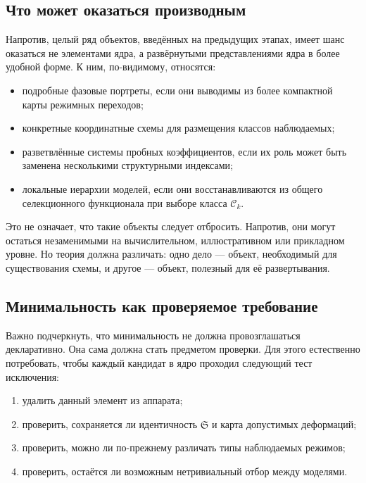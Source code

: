 \documentclass[12pt,a4paper]{article}
\begin{document}
\subsection{Что может оказаться производным}

Напротив, целый ряд объектов, введённых на предыдущих этапах, имеет шанс оказаться не элементами ядра, а развёрнутыми представлениями ядра в более удобной форме. К ним, по-видимому, относятся:
\begin{itemize}
    \item подробные фазовые портреты, если они выводимы из более компактной карты режимных переходов;
    \item конкретные координатные схемы для размещения классов наблюдаемых;
    \item разветвлённые системы пробных коэффициентов, если их роль может быть заменена несколькими структурными индексами;
    \item локальные иерархии моделей, если они восстанавливаются из общего селекционного функционала при выборе класса \(\mathcal{C}_k\).
\end{itemize}

Это не означает, что такие объекты следует отбросить. Напротив, они могут остаться незаменимыми на вычислительном, иллюстративном или прикладном уровне. Но теория должна различать: одно дело --- объект, необходимый для существования схемы, и другое --- объект, полезный для её развертывания.

\subsection{Минимальность как проверяемое требование}

Важно подчеркнуть, что минимальность не должна провозглашаться декларативно. Она сама должна стать предметом проверки. Для этого естественно потребовать, чтобы каждый кандидат в ядро проходил следующий тест исключения:
\begin{enumerate}
    \item удалить данный элемент из аппарата;
    \item проверить, сохраняется ли идентичность \(\mathfrak{S}\) и карта допустимых деформаций;
    \item проверить, можно ли по-прежнему различать типы наблюдаемых режимов;
    \item проверить, остаётся ли возможным нетривиальный отбор между моделями.
\end{enumerate}
\end{document}
